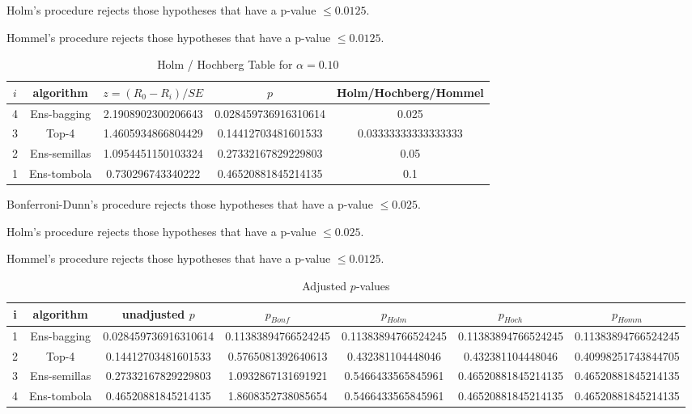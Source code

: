 \documentclass[a4paper,10pt]{article}
\begin{document}
\begin{landscape}
Holm's procedure rejects those hypotheses that have a p-value $\le0.0125$.


Hommel's procedure rejects those hypotheses that have a p-value $\le0.0125$.


\begin{table}[!htp]
\centering\tiny
\caption{Holm / Hochberg Table for $\alpha=0.10$}
\begin{tabular}{ccccc}
$i$&algorithm&$z=(R_0 - R_i)/SE$&$p$&Holm/Hochberg/Hommel\\
\hline
4&Ens-bagging&2.1908902300206643&0.028459736916310614&0.025\\
3&Top-4&1.4605934866804429&0.14412703481601533&0.03333333333333333\\
2&Ens-semillas&1.0954451150103324&0.27332167829229803&0.05\\
1&Ens-tombola&0.730296743340222&0.46520881845214135&0.1\\
\hline
\end{tabular}
\end{table}
Bonferroni-Dunn's procedure rejects those hypotheses that have a p-value $\le0.025$.


Holm's procedure rejects those hypotheses that have a p-value $\le0.025$.


Hommel's procedure rejects those hypotheses that have a p-value $\le0.0125$.


\begin{table}[!htp]
\centering\tiny
\caption{Adjusted $p$-values}
\begin{tabular}{ccccccc}
i&algorithm&unadjusted $p$&$p_{Bonf}$&$p_{Holm}$&$p_{Hoch}$&$p_{Homm}$\\
\hline
1&Ens-bagging&0.028459736916310614&0.11383894766524245&0.11383894766524245&0.11383894766524245&0.11383894766524245\\
2&Top-4&0.14412703481601533&0.5765081392640613&0.432381104448046&0.432381104448046&0.40998251743844705\\
3&Ens-semillas&0.27332167829229803&1.0932867131691921&0.5466433565845961&0.46520881845214135&0.46520881845214135\\
4&Ens-tombola&0.46520881845214135&1.8608352738085654&0.5466433565845961&0.46520881845214135&0.46520881845214135\\
\hline
\end{tabular}
\end{table}


\end{landscape}
\end{document}
